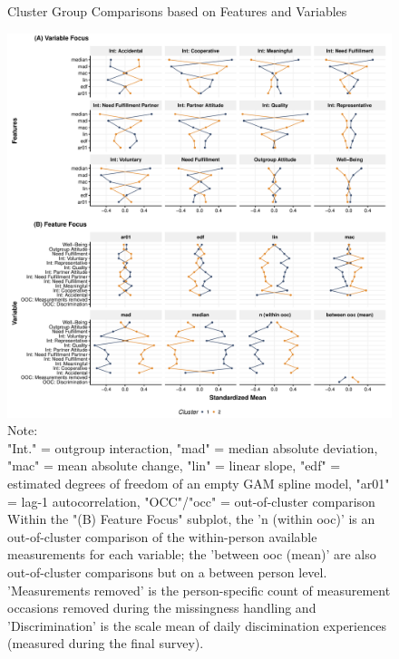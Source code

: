 \begin{figure}[!ht] %
  \caption{Cluster Group Comparisons based on Features and Variables}
  \label{fig:clusterFeatVar}
  \centering\includegraphics[width=\textwidth]{figures/clusterFeatVarComb_tutorial.pdf}
  \caption*{Note: \\
  "Int." = outgroup interaction, "mad" = median absolute deviation, "mac" = mean absolute change, "lin" = linear slope, "edf" = estimated degrees of freedom of an empty GAM spline model, "ar01" = lag-1 autocorrelation, "OCC"/"occ" = out-of-cluster comparison\\
  Within the "(B) Feature Focus" subplot, the 'n (within ooc)' is an out-of-cluster comparison of the within-person available measurements for each variable; the 'between ooc (mean)' are also out-of-cluster comparisons but on a between person level. 'Measurements removed' is the person-specific count of measurement occasions removed during the missingness handling and 'Discrimination' is the scale mean of daily discimination experiences (measured during the final survey).}
\end{figure}

